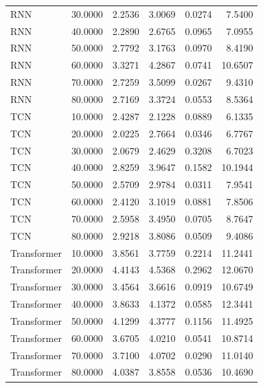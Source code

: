 \begin{tabular}{lrrrrr}
RNN & 30.0000 & 2.2536 & 3.0069 & 0.0274 & 7.5400 \\
RNN & 40.0000 & 2.2890 & 2.6765 & 0.0965 & 7.0955 \\
RNN & 50.0000 & 2.7792 & 3.1763 & 0.0970 & 8.4190 \\
RNN & 60.0000 & 3.3271 & 4.2867 & 0.0741 & 10.6507 \\
RNN & 70.0000 & 2.7259 & 3.5099 & 0.0267 & 9.4310 \\
RNN & 80.0000 & 2.7169 & 3.3724 & 0.0553 & 8.5364 \\
TCN & 10.0000 & 2.4287 & 2.1228 & 0.0889 & 6.1335 \\
TCN & 20.0000 & 2.0225 & 2.7664 & 0.0346 & 6.7767 \\
TCN & 30.0000 & 2.0679 & 2.4629 & 0.3208 & 6.7023 \\
TCN & 40.0000 & 2.8259 & 3.9647 & 0.1582 & 10.1944 \\
TCN & 50.0000 & 2.5709 & 2.9784 & 0.0311 & 7.9541 \\
TCN & 60.0000 & 2.4120 & 3.1019 & 0.0881 & 7.8506 \\
TCN & 70.0000 & 2.5958 & 3.4950 & 0.0705 & 8.7647 \\
TCN & 80.0000 & 2.9218 & 3.8086 & 0.0509 & 9.4086 \\
Transformer & 10.0000 & 3.8561 & 3.7759 & 0.2214 & 11.2441 \\
Transformer & 20.0000 & 4.4143 & 4.5368 & 0.2962 & 12.0670 \\
Transformer & 30.0000 & 3.4564 & 3.6616 & 0.0919 & 10.6749 \\
Transformer & 40.0000 & 3.8633 & 4.1372 & 0.0585 & 12.3441 \\
Transformer & 50.0000 & 4.1299 & 4.3777 & 0.1156 & 11.4925 \\
Transformer & 60.0000 & 3.6705 & 4.0210 & 0.0541 & 10.8714 \\
Transformer & 70.0000 & 3.7100 & 4.0702 & 0.0290 & 11.0140 \\
Transformer & 80.0000 & 4.0387 & 3.8558 & 0.0536 & 10.4690 \\
\bottomrule
\end{tabular}
